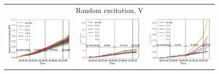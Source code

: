 \documentclass[aps
,prstab
,reprint
,longbibliography
,preprintnumbers
,showkeys
,amsfonts,amssymb,amsmath
,floatfix
]{revtex4-1}
\newlength{\thirdwidth}
\begin{document}
\begin{figure}
  \begin{tabular}{ccc}
    \multicolumn{3}{c}{Random excitation, V} \\
    \includegraphics[width=\thirdwidth]{2017_bunch_intensity_vran_no_damper_avg.png} &
    \includegraphics[width=\thirdwidth]{2017_emith_avg_rel_vran_no_damper.png} &
    \includegraphics[width=\thirdwidth]{2017_emitv_avg_rel_vran_no_damper.png} \\

\end{tabular}
\end{figure}
\end{document}
